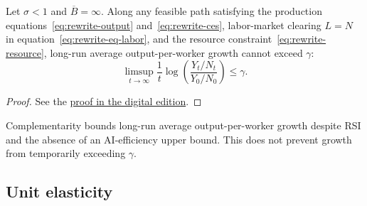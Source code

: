 \begin{proposition}
\label{prop:rewrite-uncapped-complements-bounds}
Let $\sigma<1$ and $\overline B=\infty$.
Along any feasible path satisfying the production equations~\eqref{eq:rewrite-output}
and~\eqref{eq:rewrite-ces}, labor-market clearing $L=N$ in
equation~\eqref{eq:rewrite-eq-labor},
and the resource constraint~\eqref{eq:rewrite-resource}, long-run average
output-per-worker growth cannot exceed $\gamma$:
\begin{equation}
 \limsup_{t\to\infty}\frac1t
 \log\left(\frac{Y_t/N_t}{Y_0/N_0}\right)\leq\gamma.
 \label{eq:rewrite-uncapped-complements-growth-bound}
\end{equation}
\end{proposition}
\begin{proof}
See the \href{https://oliverpardo1979.github.io/ai-growth-and-labor/#proof:rewrite-uncapped-complements-bounds}
{proof in the digital edition}.
\end{proof}

Complementarity bounds long-run average output-per-worker growth despite RSI and the absence of an AI-efficiency upper bound. This does not prevent growth from temporarily exceeding $\gamma$.

\subsection{Unit elasticity}
\label{subsec:rewrite-uncapped-unit-bgp}

